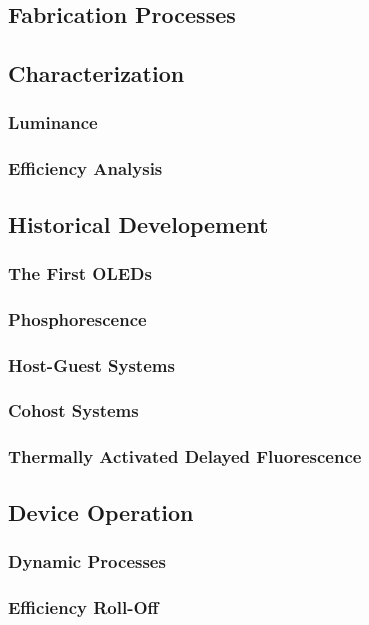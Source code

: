 \documentclass[../thesis.tex]{subfiles}
\begin{document}
\subsection{Fabrication Processes}

\subsection{Characterization}
\subsubsection{Luminance}
\subsubsection{Efficiency Analysis}

\subsection{Historical Developement}
\subsubsection{The First OLEDs}
\subsubsection{Phosphorescence}
\subsubsection{Host-Guest Systems}
\subsubsection{Cohost Systems}
\subsubsection{Thermally Activated Delayed Fluorescence}

\subsection{Device Operation}
\subsubsection{Dynamic Processes}
\subsubsection{Efficiency Roll-Off}
\end{document}
